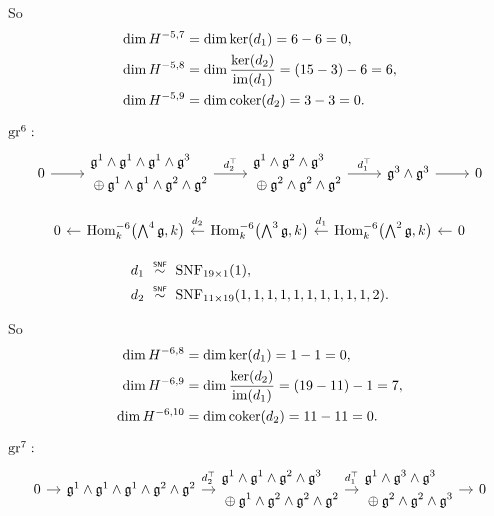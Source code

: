 So
\begin{align*}
  \dim H^{-5,7} &= \dim \operatorname{ker}(d_{1}) = 6-6 = 0, \\
  \dim H^{-5,8} &= \dim \dfrac{\operatorname{ker}(d_{2})}{\operatorname{im}(d_{1})} = (15-3) - 6 = 6, \\
  \dim H^{-5,9} &= \dim \operatorname{coker}(d_{2}) = 3 - 3 = 0.
\end{align*}

$\operatorname{gr}^{6}:$
\[
  \begin{tikzcd}[ampersand replacement=\&]
    0 \ar[r] \& \begin{aligned} &\lie{g}^{1} \wedge \lie{g}^{1} \wedge \lie{g}^{1} \wedge \lie{g}^{3} \\ &\oplus \lie{g}^{1} \wedge \lie{g}^{1} \wedge \lie{g}^{2} \wedge \lie{g}^{2} \end{aligned} \ar[r,"d_{2}^{\top}"] \& \begin{aligned} &\lie{g}^{1} \wedge \lie{g}^{2} \wedge \lie{g}^{3} \\ &\oplus \lie{g}^{2} \wedge \lie{g}^{2} \wedge \lie{g}^{2} \end{aligned} \ar[r,"d_{1}^{\top}"] \& \lie{g}^{3} \wedge \lie{g}^{3} \ar[r] \& 0
  \end{tikzcd}
\]

\[
  \begin{tikzcd}[column sep=1em]
    0 & \ar[l] \Hom_{k}^{-6}\bigl( \bigwedge^{4}\lie{g}, k \bigr) & \ar[l,"d_{2}"' {yshift=2pt}] \Hom_{k}^{-6}\bigl( \bigwedge^{3}\lie{g}, k \bigr) & \ar[l,"d_{1}"' {yshift=2pt}] \Hom_{k}^{-6}\bigl( \bigwedge^{2}\lie{g}, k \bigr) & \ar[l] 0
  \end{tikzcd}
\]

\begin{align*}
  d_{1} &\snfsim \SNF_{19\times1}(1), \\
  d_{2} &\snfsim \SNF_{11\times19}(1,1,1,1,1,1,1,1,1,1,2).
\end{align*}

So
\begin{align*}
  \dim H^{-6,8} &= \dim \operatorname{ker}(d_{1}) = 1-1 = 0, \\
  \dim H^{-6,9} &= \dim \dfrac{\operatorname{ker}(d_{2})}{\operatorname{im}(d_{1})} = (19-11) - 1 = 7, \\
  \dim H^{-6,10} &= \dim \operatorname{coker}(d_{2}) = 11 - 11 = 0.
\end{align*}

$\operatorname{gr}^{7}:$
\[
  \begin{tikzcd}[ampersand replacement=\&, column sep=1em]
    0 \ar[r] \& \lie{g}^{1} \wedge \lie{g}^{1} \wedge \lie{g}^{1} \wedge \lie{g}^{2} \wedge \lie{g}^{2} \ar[r,"d_{2}^{\top}" {yshift=2pt}] \& \begin{aligned} &\lie{g}^{1} \wedge \lie{g}^{1} \wedge \lie{g}^{2} \wedge \lie{g}^{3} \\ &\oplus \lie{g}^{1} \wedge \lie{g}^{2} \wedge \lie{g}^{2} \wedge \lie{g}^{2} \end{aligned} \ar[r,"d_{1}^{\top}" {yshift=2pt}] \& \begin{aligned} &\lie{g}^{1} \wedge \lie{g}^{3} \wedge \lie{g}^{3} \\ &\oplus \lie{g}^{2} \wedge \lie{g}^{2} \wedge \lie{g}^{3} \end{aligned}\ar[r] \& 0
  \end{tikzcd}
\]

